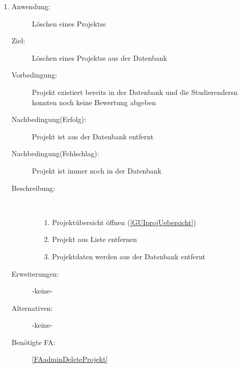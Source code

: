 \documentclass[parskip=full]{scrartcl}
\newcommand{\swtLabel}[1]{\textbf{/#1\arabic*0/}}
\begin{document}
\begin{enumerate} [label=\swtLabel{A}]
  
  \item \label{UCadminDeleteProjekt}
  \begin{description}
  \item[Anwendung:] Löschen eines \glspl{Projekt}s
  \item[Ziel:] Löschen eines \glspl{Projekt}s aus der Datenbank
  	\item[Vorbedingung:] \gls{Projekt} existiert bereits in der Datenbank und die
  	\glspl{Studierender}n konnten noch keine \gls{Bewertung} abgeben
  	\item[Nachbedingung(Erfolg):] \gls{Projekt} ist aus der Datenbank entfernt
  	\item[Nachbedingung(Fehlschlag):] \gls{Projekt} ist immer noch in der Datenbank
  	\item[Beschreibung:]~
  	\begin{enumerate} 
  	  \item[1.] \gls{Projekt}übersicht öffnen (\autoref{GUIprojUebersicht})
  	  \item[2.] \gls{Projekt} aus Liste entfernen
  	  \item[3.] \gls{Projekt}daten werden aus der Datenbank entfernt
  	\end{enumerate}
  	\item[Erweiterungen:] -keine-
  	\item[Alternativen:] -keine-
  	\item[Benötigte FA:] \ref{FAadminDeleteProjekt}
  \end{description}
   

\end{enumerate}
\end{document}
